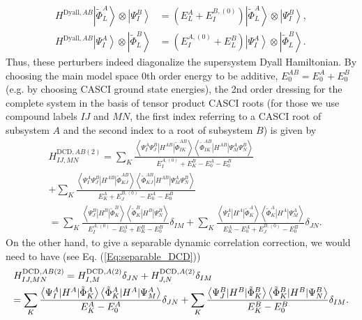 		\begin{equation}
		\begin{split}
  H_{}^{{\text{Dyall}},AB}\left| {\tilde \Phi _L^A} \right\rangle  \otimes \left| {\Psi _I^B} \right\rangle  &= \left( {E_L^A + E_I^{B,(0)}} \right)\left| {\tilde \Phi _L^A} \right\rangle  \otimes \left| {\Psi _I^B} \right\rangle, \\
  H_{}^{{\text{Dyall}},AB}\left| {\Psi _I^A} \right\rangle  \otimes \left| {\tilde \Phi _L^B} \right\rangle  &= \left( {E_I^{A,(0)} + E_L^B} \right)\left| {\Psi _I^A} \right\rangle  \otimes \left| {\tilde \Phi _L^B} \right\rangle. 
\end{split} 
\end{equation}		
Thus, these perturbers indeed diagonalize the supersystem Dyall Hamiltonian. By choosing the main model space 0th order energy to be additive, $E_0^{AB} = E_0^A + E_0^B$ (e.g. by choosing CASCI ground state energies), the 2nd order dressing for the complete system in the basis of tensor product CASCI roots (for those we use compound labels $IJ$ and $MN$, the first index referring to a CASCI root of subsystem $A$ and the second index to a root of subsystem $B$) is given by
\begin{equation}
\label{Eq:HDCD_supersystem}
\begin{split}
  &H_{IJ,MN}^{{\text{DCD}},AB(2)} = \sum\limits_K {\frac{{\left\langle {\Psi _I^A\Psi _J^B|H_{}^{AB}|\tilde \Phi _{IK}^{AB}} \right\rangle \left\langle {\tilde \Phi _{IK}^{AB}|H_{}^{AB}|\Psi _M^A\Psi _N^B} \right\rangle }}{{E_I^{A,(0)} + E_K^B - E_0^A - E_0^B}}}  \\
  &+ \sum\limits_K {\frac{{\left\langle {\Psi _I^A\Psi _J^B|H_{}^{AB}|\tilde \Phi _{KJ}^{AB}} \right\rangle \left\langle {\tilde \Phi _{KJ}^{AB}|H_{}^{AB}|\Psi _M^A\Psi _N^B} \right\rangle }}{{E_K^A + E_J^{B,(0)} - E_0^A - E_0^B}}} \\
   &= \sum\limits_K {\frac{{\left\langle {\Psi _J^B|H_{}^B|\tilde \Phi _K^B} \right\rangle \left\langle {\tilde \Phi _K^B|H_{}^B|\Psi _N^B} \right\rangle }}{{E_I^{A,(0)} - E_0^A + E_K^B - E_0^B}}\delta _{IM}^{} + } \sum\limits_K {\frac{{\left\langle {\Psi _I^A|H_{}^A|\tilde \Phi _K^A} \right\rangle \left\langle {\tilde \Phi _K^A|H_{}^A|\Psi _M^A} \right\rangle }}{{E_K^A - E_0^A + E_J^{B,(0)} - E_0^B}}} \delta _{JN}^{}. 
\end{split}
\end{equation}	
On the other hand, to give a separable dynamic correlation correction, we would need to have (see Eq. (\ref{Eq:separable_DCD}))
\begin{equation}
\begin{gathered}
  H_{IJ,MN}^{{\text{DCD}},AB(2)} = H_{I,M}^{{\text{DCD}},A(2)}{\delta _{JN}} + H_{J,N}^{{\text{DCD}},A(2)}{\delta _{IM}} \hfill \\
   = \sum\limits_K {\frac{{\left\langle {\Psi _I^A|{H^A}|\tilde \Phi _K^A} \right\rangle \left\langle {\tilde \Phi _K^A|{H^A}|\Psi _M^A} \right\rangle }}{{E_K^A - E_0^A}}} {\delta _{JN}} + \sum\limits_K {\frac{{\left\langle {\Psi _J^B|{H^B}|\tilde \Phi _K^B} \right\rangle \left\langle {\tilde \Phi _K^B|{H^B}|\Psi _N^B} \right\rangle }}{{E_K^B - E_0^B}}{\delta _{IM}}}.
\end{gathered} 
\end{equation}	
